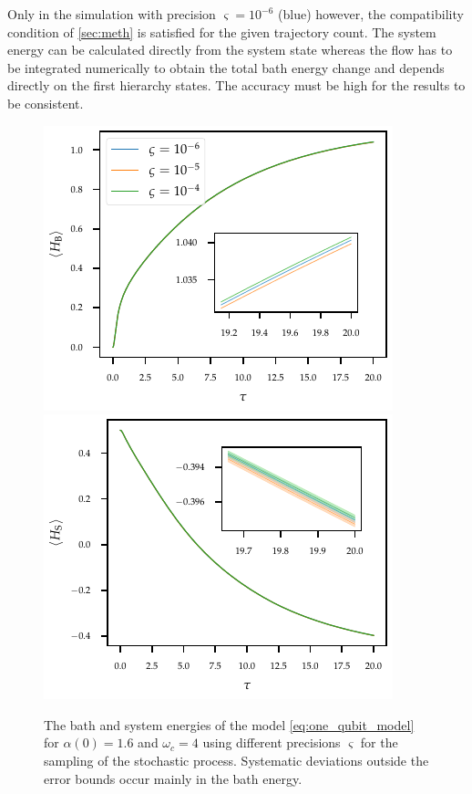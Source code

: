 Only in the simulation with precision \(\varsigma=10^{-6}\) (blue)
however, the compatibility condition of \cref{sec:meth} is satisfied
for the given trajectory count.  The system energy can be calculated
directly from the system state whereas the flow has to be integrated
numerically to obtain the total bath energy change and depends
directly on the first hierarchy states. The accuracy must be high for
the results to be consistent.
\begin{figure}[htp]
  \centering
  \includegraphics{figs/one_bath_syst/stocproc_systematics_bath_energy}
  \includegraphics{figs/one_bath_syst/stocproc_systematics_system}
  \caption{\label{fig:stocproc_bath_sys}The bath and system energies of the
    model \cref{eq:one_qubit_model} for \(α(0)=1.6\) and \(ω_c=4\)
    using different precisions \(\varsigma\) for the sampling of the
    stochastic process. Systematic deviations outside the error bounds
  occur mainly in the bath energy.}
\end{figure}

